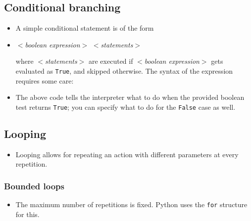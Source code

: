 \documentclass[a4paper]{article}
\begin{document}
\subsection{Conditional branching}

\begin{itemize}

\item A simple conditional statement is of the form 
\item[] 
 $<$\emph{boolean
expression}$>$  $<$\emph{statements}$>$  

where
$<$\emph{statements}$>$ are executed if $<$\emph{boolean expression}$>$ gets
evaluated as \Verb+True+, and skipped otherwise. The syntax of the expression requires some care:  


\begin{ucodeframe}
\end{ucodeframe}

\item The above code tells the interpreter what to do when the provided boolean
test returns \Verb+True+; you can specify what to do for the \Verb+False+ case
as well.

\begin{ucodeframe}
\end{ucodeframe}

\end{itemize}


\subsection{Looping}

\begin{itemize}

\item  Looping allows for repeating an action with different parameters at every
repetition. 

\end{itemize}

\subsubsection{Bounded loops}

\begin{itemize}

\item The maximum number of repetitions is fixed. Python uses the \Verb+for+
structure for this. 

\begin{ucodeframe}
\end{ucodeframe}


\end{itemize}
\end{document}
